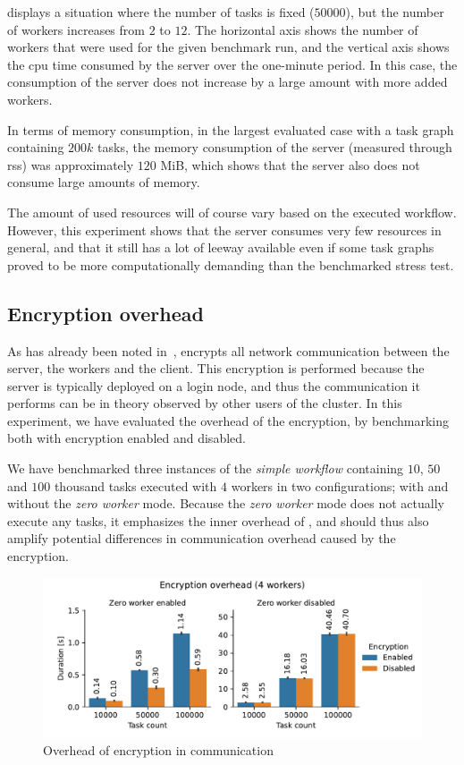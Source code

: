  displays a situation where the number of tasks
is fixed ($50000$), but the number of workers increases from
$2$ to $12$. The horizontal axis shows the number of workers
that were used for the given benchmark run, and the vertical axis shows the \gls{cpu}
time consumed by the server over the one-minute period. In this case, the consumption of the server
does not increase by a large amount with more added workers.

In terms of memory consumption, in the largest evaluated case with a task graph containing
$200k$ tasks, the memory consumption of the server (measured through
\gls{rss}) was approximately $120$ MiB, which shows that the server
also does not consume large amounts of memory.

The amount of used resources will of course vary based on the executed workflow. However, this
experiment shows that the server consumes very few resources in general, and that it still has a
lot of leeway available even if some task graphs proved to be more computationally demanding than
the benchmarked stress test.

\subsection{Encryption overhead}
\label{sec:hq-exp-encryption-overhead}
As has already been noted in~, \hyperqueue{} encrypts all network
communication between the server, the workers and the client. This encryption is performed because
the server is typically deployed on a login node, and thus the communication it performs can be in
theory observed by other users of the cluster. In this experiment, we have evaluated the overhead
of the encryption, by benchmarking \hyperqueue{} both with encryption enabled and
disabled.

We have benchmarked three instances of the \emph{simple workflow} containing
$10$, $50$ and $100$ thousand tasks
executed with $4$ \hyperqueue{} workers in two configurations; with
and without the \emph{zero worker} mode. Because the \emph{zero worker} mode does not
actually execute any tasks, it emphasizes the inner overhead of \hyperqueue{}, and should
thus also amplify potential differences in communication overhead caused by the encryption.

\begin{figure}[h]
	\centering
	\includegraphics[width=\textwidth]{imgs/hq/charts/encryption-overhead}
	\caption{Overhead of encryption in \hyperqueue{} communication}
	\label{fig:hq-encryption-overhead}
\end{figure}

